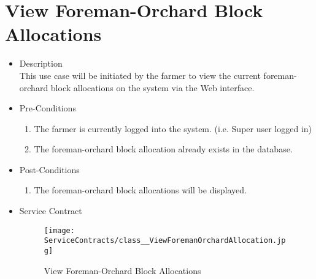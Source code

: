 \documentclass[11pt,fleqn]{book} %
\begin{document}
\section{View Foreman-Orchard Block Allocations}
\begin{itemize}
	\item Description\\
	This use case will be initiated by the farmer to view the current foreman-orchard block allocations on the system via the Web interface.
	\item Pre-Conditions
	\begin{enumerate}
		\item The farmer is currently logged into the system. (i.e. Super user logged in)
		\item The foreman-orchard block allocation already exists in the database.		
	\end{enumerate}
	\item Post-Conditions
	\begin{enumerate}
		\item The foreman-orchard block allocations will be displayed.
	\end{enumerate}
	\item Service Contract
	\begin{figure}
		\texttt{[image: ServiceContracts/class\_\_ViewForemanOrchardAllocation.jpg]}
		\caption{View Foreman-Orchard Block Allocations}
	\end{figure}
\end{itemize}
\end{document}
